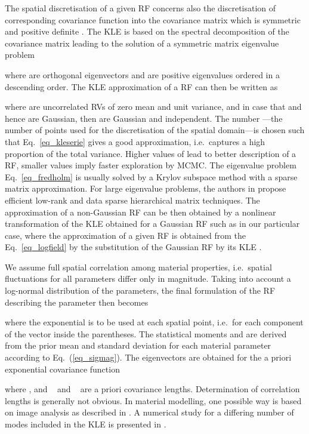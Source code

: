 \documentclass[preprint,12pt]{elsarticle}
\begin{document}
The spatial discretisation of a given RF concerns also the discretisation
of corresponding covariance function
 into the covariance matrix
 which is symmetric and positive definite
\cite{Matthies:2005:CMAME, Matthies:2007:IB}. The KLE is based on the spectral
decomposition of the covariance matrix  leading to the
solution of a symmetric matrix eigenvalue problem

where  are orthogonal eigenvectors and  are
positive eigenvalues ordered in a descending order. The KLE approximation
 of a RF 
can then be written as

where  are uncorrelated RVs of zero mean and unit
variance, and in case that  and hence
 are Gaussian, then  are Gaussian and
independent. The number ---the number of points used for the
discretisation of the spatial domain---is chosen such that
Eq.~\eqref{eq_kleserie} gives a good approximation, i.e.\ captures a
high proportion of the total variance.
Higher values of  lead to better description of a RF, smaller
values imply faster exploration by MCMC. The eigenvalue problem
Eq.~\eqref{eq_fredholm} is usually solved by a Krylov subspace method with
a sparse matrix approximation. For large eigenvalue problems, the
authors in \cite{Khoromskij:2008} propose  efficient low-rank and
data sparse hierarchical matrix techniques. The approximation of a
non-Gaussian RF can be then obtained by a nonlinear transformation of
the KLE obtained for a Gaussian RF such as in our particular case,
where the approximation of a given RF  is
obtained from the Eq.~\eqref{eq_logfield} by the substitution of the
Gaussian RF  by its KLE .

We assume full spatial correlation among material properties,
i.e.\ spatial fluctuations for all parameters differ only in
magnitude. Taking into account a log-normal distribution of the
parameters, the final formulation of the RF describing the
parameter  then becomes

where the exponential is to be used at each spatial point, i.e.\
for each component of the vector inside the parentheses. The
statistical moments  and  are derived
  from the prior mean  and standard deviation 
  for each material parameter according to Eq.~(\ref{eq_sigmag}). The
  eigenvectors  are obtained for the a priori
  exponential covariance function

where , and
~ and ~ are a priori covariance lengths.
Determination of correlation lengths is generally not obvious. In
material modelling, one possible way is based on image analysis as
described in \cite{Lombardo:2009:IJMCE}. A numerical study for a
differing number of modes  included in the KLE is presented in
\cite{Kucerova:2011:AMC}.
\end{document}
